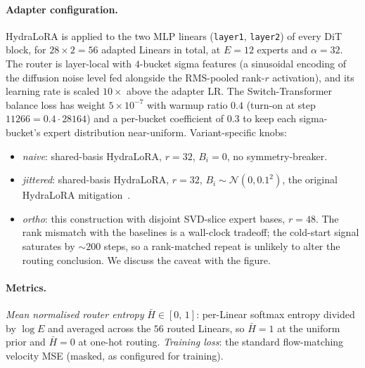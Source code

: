\documentclass[10pt]{article}
\begin{document}
\paragraph{Adapter configuration.}
HydraLoRA is applied to the two MLP linears
(\texttt{layer1}, \texttt{layer2}) of every DiT block, for
$28\!\times\!2 = 56$ adapted Linears in total, at $E\!=\!12$ experts
and $\alpha\!=\!32$. The router is layer-local with $4$-bucket sigma
features (a sinusoidal encoding of the diffusion noise level fed
alongside the RMS-pooled rank-$r$ activation), and its learning rate
is scaled $10\!\times$ above the adapter LR. The
Switch-Transformer~\cite{fedus2022switch} balance loss has weight
$5\!\times\!10^{-7}$ with warmup ratio $0.4$ (turn-on at step $11266
= 0.4\!\cdot\!28164$) and a per-bucket coefficient of $0.3$ to keep
each sigma-bucket's expert distribution near-uniform. Variant-specific
knobs:
\begin{itemize}[topsep=2pt,itemsep=0pt,leftmargin=1.2em]
\item \emph{naive}: shared-basis HydraLoRA, $r\!=\!32$, $B_i\!=\!0$,
no symmetry-breaker.
\item \emph{jittered}: shared-basis HydraLoRA, $r\!=\!32$,
$B_i\!\sim\!\mathcal{N}(0, 0.1^2)$, the original HydraLoRA
mitigation~\cite{tian2024hydralora}.
\item \emph{ortho}: this construction with disjoint SVD-slice expert
bases, $r\!=\!48$. The rank mismatch with the baselines is a
wall-clock tradeoff; the cold-start signal saturates by $\sim$$200$
steps, so a rank-matched repeat is unlikely to alter the routing
conclusion. We discuss the caveat with the figure.
\end{itemize}

\paragraph{Metrics.}
\emph{Mean normalised router entropy} $\bar H \in [0,\,1]$: per-Linear
softmax entropy divided by $\log E$ and averaged across the $56$
routed Linears, so $\bar H\!=\!1$ at the uniform prior and
$\bar H\!=\!0$ at one-hot routing. \emph{Training loss}: the standard
flow-matching velocity MSE (masked, as configured for training).
\end{document}
